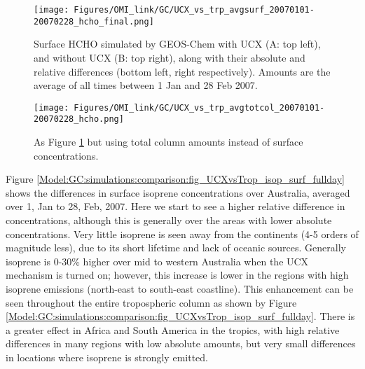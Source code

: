       \begin{figure}
        \texttt{[image: Figures/OMI\_link/GC/UCX\_vs\_trp\_avgsurf\_20070101-20070228\_hcho\_final.png]}
        \caption{%
          Surface HCHO simulated by GEOS-Chem with UCX (A: top left), and without UCX (B: top right), along with their absolute and relative differences (bottom left, right respectively).
          Amounts are the average of all times between 1 Jan and 28 Feb 2007.
        }
        \label{Model:GC:simulations:comparison:fig_UCXvsTrop_HCHO_surf_fullday}
      \end{figure}
      
      \begin{figure}
        \texttt{[image: Figures/OMI\_link/GC/UCX\_vs\_trp\_avgtotcol\_20070101-20070228\_hcho.png]}
        \caption{%
          As Figure \ref{Model:GC:simulations:comparison:fig_UCXvsTrop_HCHO_surf_fullday} but using total column amounts instead of surface concentrations.
        }
        \label{Model:GC:simulations:comparison:fig_UCXvsTrop_HCHO_totcol_fullday}
      \end{figure}
      
      
      Figure \ref{Model:GC:simulations:comparison:fig_UCXvsTrop_isop_surf_fullday} shows the differences in surface isoprene concentrations over Australia, averaged over 1, Jan to 28, Feb, 2007.
      Here we start to see a higher relative difference in concentrations, although this is generally over the areas with lower absolute concentrations. 
      Very little isoprene is seen away from the continents (4-5 orders of magnitude less), due to its short lifetime and  lack of oceanic sources.
      Generally isoprene is 0-30\% higher over mid to western Australia when the UCX mechanism is turned on; however, this increase is lower in the regions with high isoprene emissions (north-east to south-east coastline).
      This enhancement can be seen throughout the entire tropospheric column as shown by Figure \ref{Model:GC:simulations:comparison:fig_UCXvsTrop_isop_surf_fullday}.
      There is a greater effect in Africa and South America in the tropics, with high relative differences in many regions with low absolute amounts, but very small differences in locations where isoprene is strongly emitted.
      
